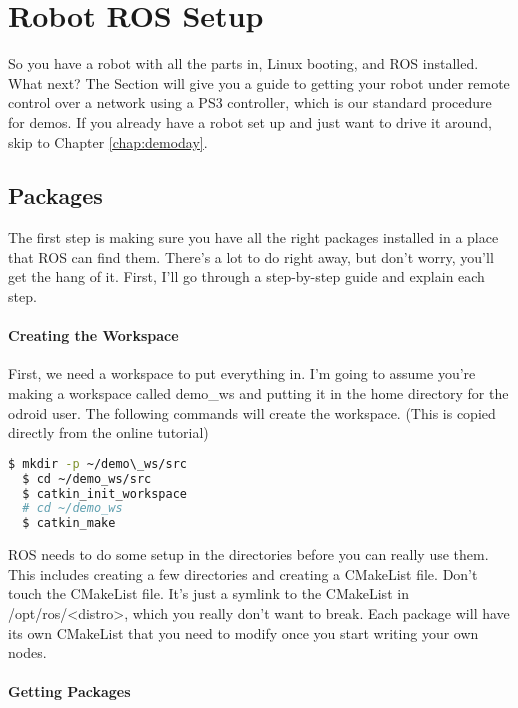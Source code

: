 
\chapter{Robot ROS Setup}
\label{chap:rossetup}

So you have a robot with all the parts in, Linux booting, and ROS installed. What next? The Section will give you a guide to getting your robot under remote control over a network using a PS3 controller, which is our standard procedure for demos. If you already have a robot set up and just want to drive it around, skip to Chapter \ref{chap:demoday}.

\section{Packages}

The first step is making sure you have all the right packages installed in a place that ROS can find them. There's a lot to do right away, but don't worry, you'll get the hang of it. First, I'll go through a step-by-step guide and explain each step.

\subsubsection{Creating the Workspace}

First, we need a workspace to put everything in. I'm going to assume you're making a workspace called demo\_ws and putting it in the home directory for the odroid user. The following commands will create the workspace. (This is copied directly from the online tutorial)

\begin{lstlisting}[language=bash]
  $ mkdir -p ~/demo\_ws/src
  $ cd ~/demo_ws/src
  $ catkin_init_workspace
  # cd ~/demo_ws
  $ catkin_make
\end{lstlisting}

ROS needs to do some setup in the directories before you can really use them. This includes creating a few directories and creating a CMakeList file. Don't touch the CMakeList file. It's just a symlink to the CMakeList in /opt/ros/<distro>, which you really don't want to break. Each package will have its own CMakeList that you need to modify once you start writing your own nodes.

\subsubsection{Getting Packages}

